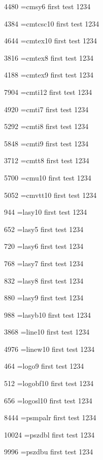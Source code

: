 4480	\tstfont \font\tstfont=cmsy6 first test 1234 

4384	\tstfont \font\tstfont=cmtcsc10 first test 1234 

4644	\tstfont \font\tstfont=cmtex10 first test 1234 

3816	\tstfont \font\tstfont=cmtex8 first test 1234 

4188	\tstfont \font\tstfont=cmtex9 first test 1234 

7904	\tstfont \font\tstfont=cmti12 first test 1234 

4920	\tstfont \font\tstfont=cmti7 first test 1234 

5292	\tstfont \font\tstfont=cmti8 first test 1234 

5848	\tstfont \font\tstfont=cmti9 first test 1234 

3712	\tstfont \font\tstfont=cmtt8 first test 1234 

5700	\tstfont \font\tstfont=cmu10 first test 1234 

5052	\tstfont \font\tstfont=cmvtt10 first test 1234 

944	\tstfont \font\tstfont=lasy10 first test 1234 

652	\tstfont \font\tstfont=lasy5 first test 1234 

720	\tstfont \font\tstfont=lasy6 first test 1234 

768	\tstfont \font\tstfont=lasy7 first test 1234 

832	\tstfont \font\tstfont=lasy8 first test 1234 

880	\tstfont \font\tstfont=lasy9 first test 1234 

988	\tstfont \font\tstfont=lasyb10 first test 1234 

3868	\tstfont \font\tstfont=line10 first test 1234 

4976	\tstfont \font\tstfont=linew10 first test 1234 

464	\tstfont \font\tstfont=logo9 first test 1234 

512	\tstfont \font\tstfont=logobf10 first test 1234 

656	\tstfont \font\tstfont=logosl10 first test 1234 

8444	\tstfont \font\tstfont=psmpalr first test 1234 

10024	\tstfont \font\tstfont=pszdbl first test 1234 

9996	\tstfont \font\tstfont=pszdbu first test 1234 



\bye



